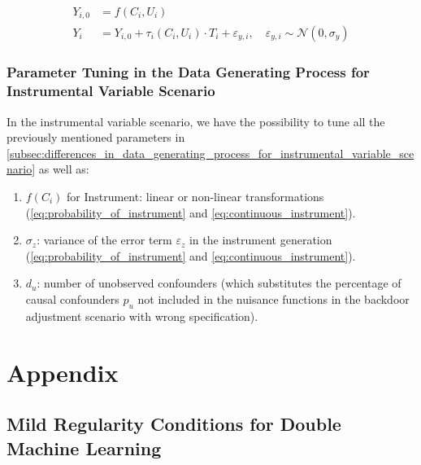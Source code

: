 \documentclass{article}
\numberwithin{equation}{section}
\begin{document}
\begin{align}
    Y_{i, 0} &= f(C_i, U_i) \\
    Y_i &= Y_{i, 0} + \tau_i(C_i, U_i) \cdot T_i + \varepsilon_{y, i}, \quad \varepsilon_{y, i} \sim \mathcal{N}(0, \sigma_{y})
\end{align}

\subsubsection{Parameter Tuning in the Data Generating Process for Instrumental Variable Scenario}
In the instrumental variable scenario, we have the possibility to tune all the previously mentioned parameters in \eqref{subsec:differences_in_data_generating_process_for_instrumental_variable_scenario} as well as:

\begin{enumerate}[label=\roman*.]
    \item $f(C_i)$ for Instrument: linear or non-linear transformations (\ref{eq:probability_of_instrument} and \ref{eq:continuous_instrument}).
    \item $\sigma_z$: variance of the error term $\varepsilon_z$ in the instrument generation (\ref{eq:probability_of_instrument} and \ref{eq:continuous_instrument}).
    \item $d_u$: number of unobserved confounders (which substitutes the percentage of causal confounders $p_u$ not included in the nuisance functions in the backdoor adjustment scenario with wrong specification).
\end{enumerate}

\newpage

\section{Appendix}

\subsection{Mild Regularity Conditions for Double Machine Learning}
\label{subsec:appendix_mild_regularity_conditions_for_dml}
\end{document}
